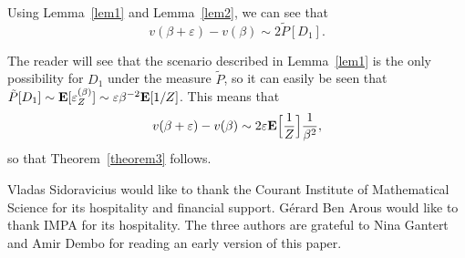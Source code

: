 \documentclass[12pt]{amsart}
\numberwithin{equation}{section}
\begin{document}
 Using Lemma~\ref{lem1} and Lemma~\ref{lem2}, we can see that
 \[
 v(\beta+{\varepsilon})-v(\beta)\sim  2 \tilde{P}[D_1].
 \]
 
 The reader will see that the scenario described in Lemma~\ref{lem1} is the only possibility for $D_1$ under the measure $\tilde{P}$, so it can easily be seen that $\tilde{P}[D_1]\sim {\bf E}[{\varepsilon}_Z^{(\beta)}] \sim {\varepsilon} \beta^{-2} {\bf E}[1/Z]$. This means that 
 \[
 v(\beta+{\varepsilon})-v(\beta)\sim  2 {\varepsilon} {\bf E}\Bigl[\frac 1Z\Bigr] \frac 1{\beta^2},
 \]
  so that Theorem~\ref{theorem3} follows.
 
 
Vladas Sidoravicius would like to thank the Courant Institute of Mathematical Science for its hospitality and financial support. G\'erard Ben Arous would like to thank IMPA for its hospitality. The three authors are grateful to Nina Gantert and Amir Dembo for reading an early version of this paper.
\end{document}
